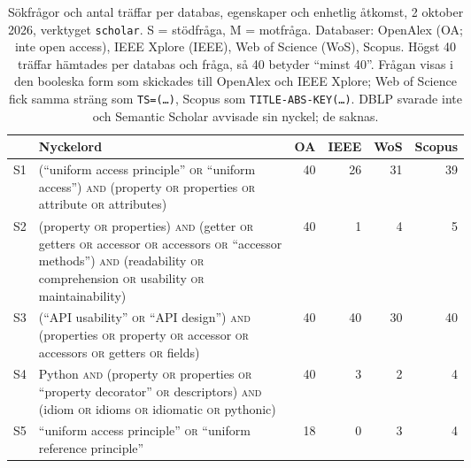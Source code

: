 \begin{table}[!b]
  \caption{Sökfrågor och antal träffar per databas,
    egenskaper och enhetlig åtkomst, 2 oktober 2026, verktyget
    \texttt{scholar}.  S = stödfråga, M = motfråga.  Databaser: OpenAlex
    (OA; inte \foreignlanguage{english}{open access}), IEEE Xplore
    (IEEE), Web of Science (WoS), Scopus.  Högst 40 träffar hämtades per
    databas och fråga, så 40 betyder \enquote{minst 40}.  Frågan visas i
    den booleska form som skickades till OpenAlex och IEEE Xplore; Web
    of Science fick samma sträng som \texttt{TS=(\dots)}, Scopus som
    \texttt{TITLE-ABS-KEY(\dots)}.  DBLP svarade inte och Semantic
    Scholar avvisade sin nyckel; de saknas.}
  \label{tab:sok-queries-egenskaper}
    \centering\scriptsize
    \begin{tabular}{@{}lp{0.6\linewidth}rrrr@{}}
      \toprule
      & Nyckelord & OA & IEEE & WoS & Scopus \\
      \midrule
      S1 & (\enquote{uniform access principle} \textsc{or} \enquote{uniform access}) \textsc{and} (property \textsc{or} properties \textsc{or} attribute \textsc{or} attributes)
         & 40 & 26 & 31 & 39 \\
      S2 & (property \textsc{or} properties) \textsc{and} (getter \textsc{or} getters \textsc{or} accessor \textsc{or} accessors \textsc{or} \enquote{accessor methods}) \textsc{and} (readability \textsc{or} comprehension \textsc{or} usability \textsc{or} maintainability)
         & 40 & 1 & 4 & 5 \\
      S3 & (\enquote{API usability} \textsc{or} \enquote{API design}) \textsc{and} (properties \textsc{or} property \textsc{or} accessor \textsc{or} accessors \textsc{or} getters \textsc{or} fields)
         & 40 & 40 & 30 & 40 \\
      S4 & Python \textsc{and} (property \textsc{or} properties \textsc{or} \enquote{property decorator} \textsc{or} descriptors) \textsc{and} (idiom \textsc{or} idioms \textsc{or} idiomatic \textsc{or} pythonic)
         & 40 & 3 & 2 & 4 \\
      S5 & \enquote{uniform access principle} \textsc{or} \enquote{uniform reference principle}
         & 18 & 0 & 3 & 4 \\

\end{tabular}
\end{table}
